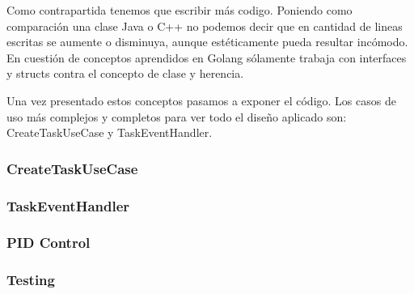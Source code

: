 Como contrapartida tenemos que escribir más codigo.
Poniendo como comparación una clase Java o C++ no podemos decir que en cantidad de lineas escritas se aumente o disminuya, aunque estéticamente pueda resultar incómodo.
En cuestión de conceptos aprendidos en Golang sólamente trabaja con interfaces y structs contra el concepto de clase y herencia.

Una vez presentado estos conceptos pasamos a exponer el código.
Los casos de uso más complejos y completos para ver todo el diseño aplicado son: CreateTaskUseCase y TaskEventHandler.

\subsubsection{CreateTaskUseCase}\label{subsubsec:CreateTaskUseCase}
    
\subsubsection{TaskEventHandler}
    
\subsubsection{PID Control}\label{subsubsec:pidControl}
    
\subsubsection{Testing}
    


